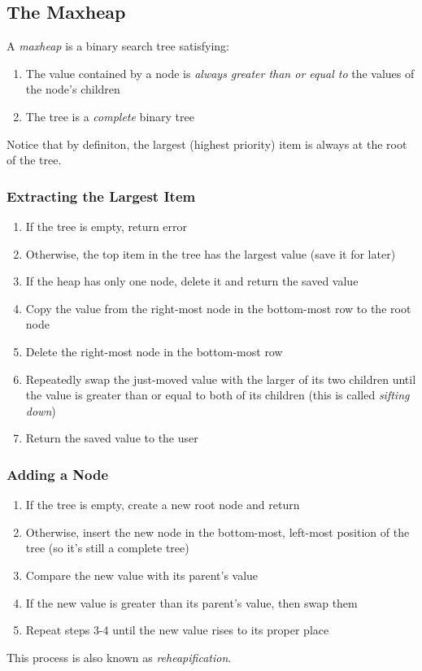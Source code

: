 \documentclass[class=article, crop=false]{standalone}
\begin{document}
  \subsection{The Maxheap}
  A \emph{maxheap} is a binary search tree satisfying:
  \begin{enumerate}
    \item The value contained by a node is \emph{always greater than or equal to} the values of the node's children
    \item The tree is a \emph{complete} binary tree
  \end{enumerate}
  Notice that by definiton, the largest (highest priority) item is always at the root of the tree.
  \subsubsection{Extracting the Largest Item}
  \begin{enumerate}
    \item If the tree is empty, return error
    \item Otherwise, the top item in the tree has the largest value (save it for later)
    \item If the heap has only one node, delete it and return the saved value
    \item Copy the value from the right-most node in the bottom-most row to the root node
    \item Delete the right-most node in the bottom-most row
    \item Repeatedly swap the just-moved value with the larger of its two children until the value is greater than or equal to both of its children (this is called \emph{sifting down})
    \item Return the saved value to the user
  \end{enumerate}
  \subsubsection{Adding a Node}
  \begin{enumerate}
    \item If the tree is empty, create a new root node and return
    \item Otherwise, insert the new node in the bottom-most, left-most position of the tree (so it's still a complete tree)
    \item Compare the new value with its parent's value
    \item If the new value is greater than its parent's value, then swap them
    \item Repeat steps 3-4 until the new value rises to its proper place
  \end{enumerate}
  \begin{note}{}
    This process is also known as \emph{reheapification}.
  \end{note}
\end{document}
